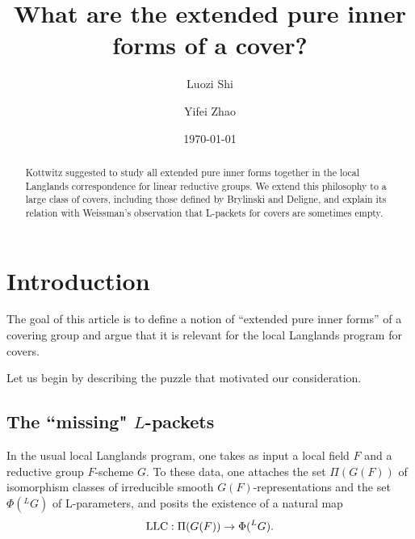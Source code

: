 \documentclass[10pt,english,reqno]{amsart}
\title[Extended pure inner forms of covers]{What are the extended pure inner forms of a cover?}
\author{Luozi Shi \and Yifei Zhao}
\date{\today}
\newcommand{\LLC}{\textnormal{LLC}}
\theoremstyle{definition}
\numberwithin{equation}{section}
\begin{document}
\begin{abstract}
Kottwitz suggested to study all extended pure inner forms together in the local Langlands correspondence for linear reductive groups. We extend this philosophy to a large class of covers, including those defined by Brylinski and Deligne, and explain its relation with Weissman's observation that L-packets for covers are sometimes empty.
\end{abstract}

\maketitle

\setcounter{tocdepth}{2}
\tableofcontents


\section*{Introduction}

The goal of this article is to define a notion of ``extended pure inner forms'' of a covering group and argue that it is relevant for the local Langlands program for covers.

Let us begin by describing the puzzle that motivated our consideration.


\subsection{The ``missing" $L$-packets}

In the usual local Langlands program, one takes as input a local field $F$ and a reductive group $F$-scheme $G$. To these data, one attaches the set $\Pi(G(F))$ of isomorphism classes of irreducible smooth $G(F)$-representations and the set $\Phi({}^LG)$ of L-parameters, and posits the existence of a natural map
\begin{equation}
\label{eq-local-langlands-correspondence-intro}
\LLC : \Pi(G(F)) \rightarrow \Phi({}^LG).
\end{equation}
\end{document}
